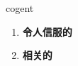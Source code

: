 
\begin{frame}
{\huge cogent}
\begin{center}
\begin{enumerate}\Large
  \item \textbf{令人信服的}
  \item \textbf{相关的}
\end{enumerate}
\end{center}
\end{frame}
